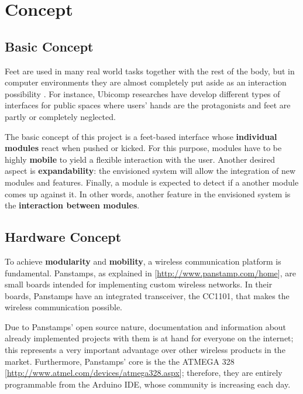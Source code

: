 \section{Concept}
\subsection{Basic Concept}
Feet are used in many real world tasks together with the rest of the body, but in computer environments they are almost completely put aside as an interaction possibility \cite{pakkanen}. For instance, Ubicomp researches have develop different types of interfaces for public spaces where users' hands are the protagonists and feet are partly or completely neglected. 

The basic concept of this project is a feet-based interface whose \textbf{individual modules} react when pushed or kicked. For this purpose, modules have to be highly \textbf {mobile} to yield a flexible interaction with the user. Another desired aspect is \textbf {expandability}: the envisioned system will allow the integration of new modules and features. %
Finally, a module is expected to detect if a another module comes up against it. In other words, another feature in the envisioned system is the \textbf{interaction between modules}. 


\subsection{Hardware Concept}
To achieve \textbf{modularity} and \textbf{mobility}, a wireless communication platform is fundamental.   
Panstamps, as explained in [{\url{http://www.panstamp.com/home}}], are small boards intended for implementing custom wireless networks. In their boards, Panstamps have an integrated transceiver, the CC1101, that makes the wireless communication possible. %

Due to Panstamps' open source nature, documentation and information about already implemented projects with them is at hand for everyone on the internet; this represents a very important advantage over other wireless products in the market. %
Furthermore, Panstamps' core is the the ATMEGA 328 [{\url{http://www.atmel.com/devices/atmega328.aspx}}]; therefore, they are entirely programmable from the Arduino IDE, whose community is increasing each day.%

